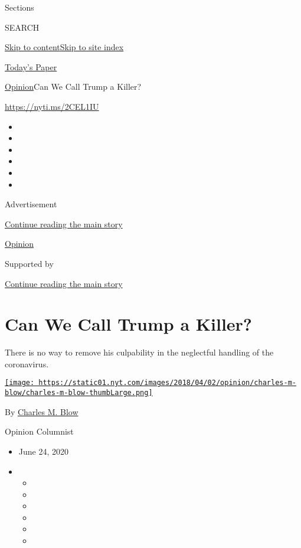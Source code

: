 Sections

SEARCH

\protect\hyperlink{site-content}{Skip to
content}\protect\hyperlink{site-index}{Skip to site index}

\href{https://myaccount.nytimes.com/auth/login?response_type=cookie\&client_id=vi}{}

\href{https://www.nytimes.com/section/todayspaper}{Today's Paper}

\href{/section/opinion}{Opinion}\textbar{}Can We Call Trump a Killer?

\url{https://nyti.ms/2CEL1IU}

\begin{itemize}
\item
\item
\item
\item
\item
\item
\end{itemize}

Advertisement

\protect\hyperlink{after-top}{Continue reading the main story}

\href{/section/opinion}{Opinion}

Supported by

\protect\hyperlink{after-sponsor}{Continue reading the main story}

\hypertarget{can-we-call-trump-a-killer}{%
\section{Can We Call Trump a Killer?}\label{can-we-call-trump-a-killer}}

There is no way to remove his culpability in the neglectful handling of
the coronavirus.

\href{https://www.nytimes.com/by/charles-m-blow}{\texttt{[image: https://static01.nyt.com/images/2018/04/02/opinion/charles-m-blow/charles-m-blow-thumbLarge.png]}}

By \href{https://www.nytimes.com/by/charles-m-blow}{Charles M. Blow}

Opinion Columnist

\begin{itemize}
\item
  June 24, 2020
\item
  \begin{itemize}
  \item
  \item
  \item
  \item
  \item
  \item
  \end{itemize}
\end{itemize}

